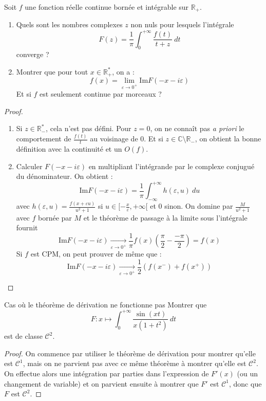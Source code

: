 \documentclass[french,a4paper]{article}
\newcommand{\R}{\mathbb{R}}
\newcommand{\C}{\mathbb{C}}
\newcommand{\st}{^*}
\newcommand{\im}{\text{Im}}
\theoremstyle{plain}
\theoremstyle{definition}
\theoremstyle{remark}
\begin{document}
\begin{ex}[Moulin.IP.30]{}
	Soit $f$ une fonction réelle continue bornée et intégrable sur $\R_+$.
	\begin{enumerate}
		\item Quels sont les nombres complexes $z$ non nuls pour lesquels l'intégrale $$F(z)=\frac{1}{\pi}\int_{0}^{+\infty}\frac{f(t)}{t+z}\ dt$$ converge ?
		\item Montrer que pour tout $x\in\R_+\st$, on a : $$f(x)=\lim_{\varepsilon\to0^+}\im F(-x-i\varepsilon)$$ Et si $f$ est seulement continue par morceaux ?
	\end{enumerate}
\end{ex}
\begin{proof}
	\begin{enumerate}
		\item Si $z\in\R_-\st$, cela n'est pas défini. Pour $z=0$, on ne connaît pas \textit{a priori} le comportement de $\displaystyle\frac{f(t)}{t}$ au voisinage de $0$. Et si $z\in\C\setminus\R_-$, on obtient la bonne définition avec la continuité et un $O(f)$.
		\item Calculer $F(-x-i\varepsilon)$ en multipliant l'intégrande par le complexe conjugué du dénominateur. On obtient : $$\im F(-x-i\varepsilon)=\frac{1}{\pi}\int_{-\infty}^{+\infty}h(\varepsilon, u)\ du$$ avec $h(\varepsilon,u) =\frac{f(x+\varepsilon u)}{u^2+1}$ si $u\in[-\frac{x}{\varepsilon},+\infty[$ et $0$ sinon. On domine par $\displaystyle\frac{M}{u^2+1}$ avec $f$ bornée par $M$ et le théorème de passage à la limite sous l'intégrale fournit $$\im F(-x-i\varepsilon)\xrightarrow[\varepsilon\to 0^+]{}\frac{1}{\pi}f(x)\left(\frac{\pi}{2}-\frac{-\pi}{2}\right)=f(x)$$ Si $f$ est CPM, on peut prouver de même que : $$\im F(-x-i\varepsilon)\xrightarrow[\varepsilon\to 0^+]{}\frac12\left(f(x^-)+f(x^+)\right)$$
	\end{enumerate}
\end{proof}
\begin{ex}[Châteaux]{Cas où le théorème de dérivation ne fonctionne pas} Montrer que $$F:x\mapsto\int_{0}^{+\infty}\frac{\sin(xt)}{x(1+t^2)} \ dt$$ est de classe $\mathcal{C}^2$.
\end{ex} 
\begin{proof}
	On commence par utiliser le théorème de dérivation pour montrer qu'elle est $\mathcal{C}^1$, mais on ne parvient pas avec ce même théorème à montrer qu'elle est $\mathcal{C}^2$. On effectue alors une intégration par parties dans l’expression de $F'(x)$ (ou un changement de variable) et on parvient ensuite à montrer que $F'$ est $\mathcal{C}^1$, donc que $F$ est $\mathcal{C}^2$.
\end{proof}
\end{document}
